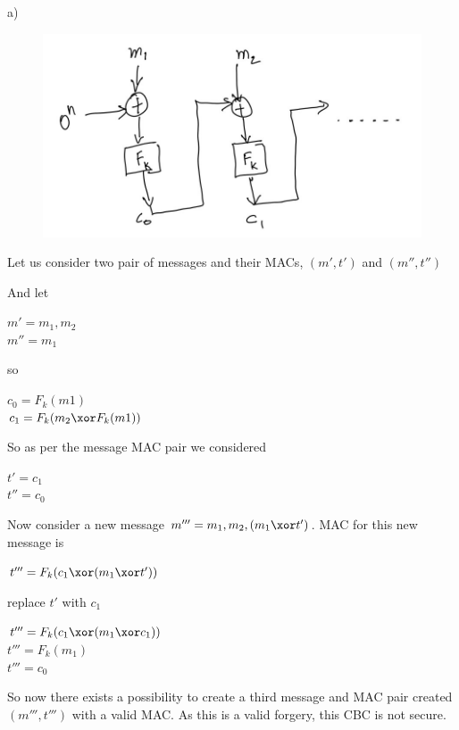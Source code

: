 a)
\begin{figure}[h]
    \includegraphics[width=\textwidth,height=\textheight,keepaspectratio]{7-3 IMG.jpg}
    \centering
\end{figure}


Let us consider two pair of messages and their MACs, $(m', t')$ and $(m'', t'')$

And let 
\begin{center}
    $m' = {m_1, m_2 }$ \\
    $m'' = {m_1}$ 
\end{center}

so

\begin{center}
    $c_0 = F_k(m1)$\\
    $c_1 = F_k(m_2 \xor F_k(m1))$
\end{center}

So as per the message MAC pair we considered 
\begin{center}
    $t' = c_1$\\
    $t''= c_0$
\end{center}

Now consider a new message $m''' = {m_1, m_2, (m_1 \xor t')}$. MAC for this new 
message is 
\begin{center}
    $t''' = F_k(c_1 \xor (m_1 \xor t'))$\\
\end{center}
    replace $t'$ with $c_1$\\
\begin{center}
    $t''' = F_k(c_1 \xor (m_1 \xor c_1))$ \\
    $t''' = F_k(m_1)$\\
    $t''' = c_0$
\end{center}

So now there exists a possibility to create a third message and MAC pair created
$(m''', t''')$ with a valid MAC. As this is a valid forgery, this CBC is not secure.